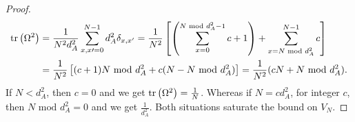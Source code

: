\begin{proof}
        \begin{align*}
            \text{tr}\left( \Omega^2 \right) &= \frac{1}{N^2 d_A^2} \sum_{x, x\prime = 0}^{N-1} d_A^2 \delta_{x, x^\prime} = \frac{1}{N^2} \left[ \left( \sum_{x=0}^{N \text{ mod } d_A^2 - 1} c + 1 \right) + \sum_{x = N \text{ mod } d_A^2}^{N-1} c \right] \\
            &= \frac{1}{N^2} \left[ (c+1) N \text{ mod } d_A^2 + c (N - N \text{ mod } d_A^2) \right] = \frac{1}{N^2} (cN + N \text{ mod } d_A^2).
        \end{align*}
        If $N < d_A^2$, then $c = 0$ and we get $\text{tr}\left( \Omega^2 \right) = \frac{1}{N}$. Whereas if $N = c d_A^2$, for integer $c$, then $N \text{ mod } d_A^2 = 0$ and we get $\frac{1}{d_A^2}$. Both situations saturate the bound on $V_N$.
    \end{proof}


